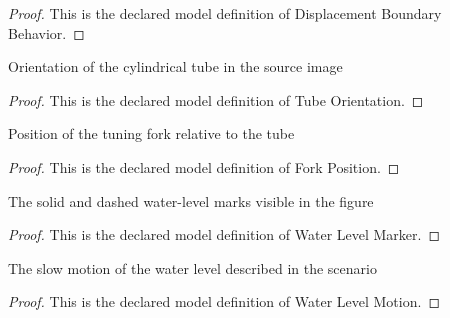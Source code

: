 \begin{proof}
  This is the declared model definition of Displacement Boundary Behavior.
\end{proof}
\begin{definition}
  \label{def:physics:phyx-mini-0223:phyxminiproblems-problemphyxmini0223-tubeorientation}
  Orientation of the cylindrical tube in the source image
\end{definition}
\begin{proof}
  This is the declared model definition of Tube Orientation.
\end{proof}
\begin{definition}
  \label{def:physics:phyx-mini-0223:phyxminiproblems-problemphyxmini0223-forkposition}
  Position of the tuning fork relative to the tube
\end{definition}
\begin{proof}
  This is the declared model definition of Fork Position.
\end{proof}
\begin{definition}
  \label{def:physics:phyx-mini-0223:phyxminiproblems-problemphyxmini0223-waterlevelmarker}
  The solid and dashed water-level marks visible in the figure
\end{definition}
\begin{proof}
  This is the declared model definition of Water Level Marker.
\end{proof}
\begin{definition}
  \label{def:physics:phyx-mini-0223:phyxminiproblems-problemphyxmini0223-waterlevelmotion}
  The slow motion of the water level described in the scenario
\end{definition}
\begin{proof}
  This is the declared model definition of Water Level Motion.
\end{proof}
